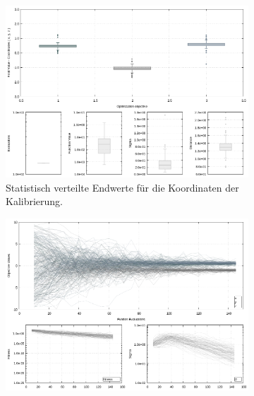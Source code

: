 %
\lipsum[1]
%
\begin{figure}[!ht]
         \centering
         \begin{subfigure}[t]{0.4\textwidth}
                 \centering
                 \includegraphics[width=\textwidth]{img/calibration/aborted_calibration_ant0-boxes.png}
                 \caption{Statistisch verteilte Endwerte für die Koordinaten der Kalibrierung.}
                 \label{fig:abortedFinal_Calibration_Ant0_ES-boxes}
         \end{subfigure}
%
\qquad         
%
         \begin{subfigure}[t]{0.4\textwidth}
                 \centering
                 \includegraphics[width=\textwidth]{img/calibration/aborted_calibration_ant0-lines.png}

\end{subfigure}
\end{figure}
